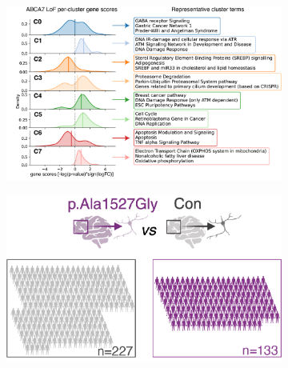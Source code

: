 \begin{figure}[H]
\begin{subfigure}[t]{0.45\textwidth}
        \caption{}
        \includegraphics[width=\textwidth]{./main_plots/kl_densities.png}        
    \end{subfigure}
    \begin{subfigure}[t]{0.3\textwidth}
        \caption{}
        \includegraphics[width=\textwidth]{./main_plots/common_var_cohort_cartoon.png}        
    \end{subfigure}
    \hspace{0.01\textwidth} %
    \begin{subfigure}[t]{0.225\textwidth}
        \caption{}

\end{subfigure}
\end{figure}
